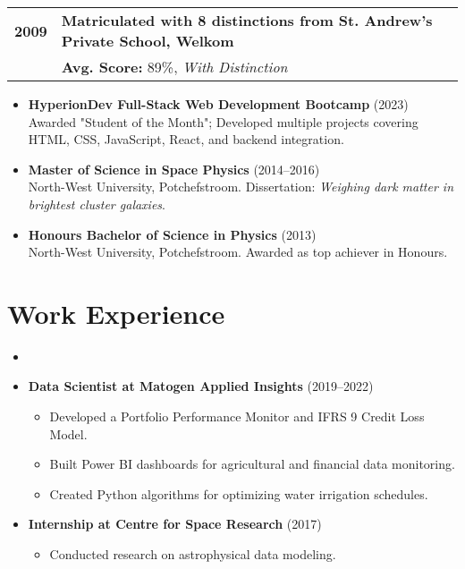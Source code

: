 \documentclass[a4paper,10pt]{article}
\begin{document}
\begin{tabularx}{\textwidth}{r l X}
	\textbf{2009} & \multicolumn{2}{X}{\textbf{Matriculated with 8 distinctions from St. Andrew’s Private School, Welkom}}\\
	& \multicolumn{2}{X}{\textbf{Avg. Score:} 89\%, \textit{With Distinction}}\\
\end{tabularx}

\begin{itemize}
	\item \textbf{HyperionDev Full-Stack Web Development Bootcamp} (2023)\\
	Awarded "Student of the Month"; Developed multiple projects covering HTML, CSS, JavaScript, React, and backend integration.
	\item \textbf{Master of Science in Space Physics} (2014--2016)\\
	North-West University, Potchefstroom. Dissertation: \textit{Weighing dark matter in brightest cluster galaxies}.
	\item \textbf{Honours Bachelor of Science in Physics} (2013)\\
	North-West University, Potchefstroom. Awarded as top achiever in Honours.
\end{itemize}

\section*{Work Experience}
\begin{itemize}
	\item 
	\item \textbf{Data Scientist at Matogen Applied Insights} (2019--2022)
	\begin{itemize}
		\item Developed a Portfolio Performance Monitor and IFRS 9 Credit Loss Model.
		\item Built Power BI dashboards for agricultural and financial data monitoring.
		\item Created Python algorithms for optimizing water irrigation schedules.
	\end{itemize}
	\item \textbf{Internship at Centre for Space Research} (2017)
	\begin{itemize}
		\item Conducted research on astrophysical data modeling.
	\end{itemize}
\end{itemize}
\end{document}
